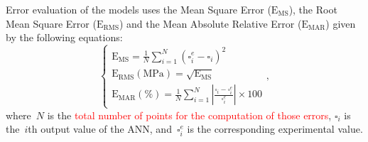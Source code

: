 \documentclass[algorithms,article,submit,pdftex,oneauthors]{Definitions/mdpi}
\DeclareRobustCommand{\MSE}{\text{E}_\text{MS}}
\DeclareRobustCommand{\RMSE}{\text{E}_\text{RMS}}
\DeclareRobustCommand{\MARE}{\text{E}_\text{MAR}}
\DeclareRobustCommand{\MPa}{\text{MPa}}
\begin{document}
\textcolor{greencolor}{Error evaluation of the models uses the Mean Square Error ($\MSE$), the Root Mean Square Error ($\RMSE$) and the Mean Absolute Relative Error ($\MARE$) given by the following equations:}
\begin{equation}
\begin{cases}
\MSE = \frac{1}{N} \sum_{i=1}^{N} \left(\square_i^e - \square_i\right)^2\\
\RMSE (\MPa) = \sqrt{\MSE}\\
\MARE(\%) = \frac{1}{N} \sum_{i=1}^{N}{\left|\frac{\square_i -\square_i^e}{\square_i^e}\right|} \times 100
\end{cases},
\label{eq:Errors}
\end{equation}
\textcolor{greencolor}{where~$N$ is the \textcolor{red}{total number of points for the computation of those errors}, $\square_i$ is the~$i$th output value of the ANN, and~$\square_i^e$ is the corresponding experimental value.}
\end{document}
